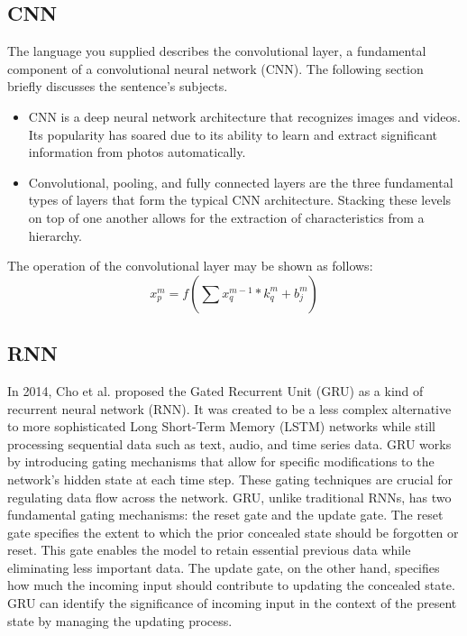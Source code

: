 \documentclass[a4paper,fleqn]{cas-sc}
\begin{document}
  \subsection{CNN}
  The language you supplied describes the convolutional layer, a fundamental component of a convolutional neural
  network (CNN). The following section briefly discusses the sentence’s subjects.\\
  \begin{itemize}
    \item CNN is a deep neural network architecture that recognizes images and videos. Its popularity has soared due to
    its ability to learn and extract significant information from photos automatically.
    \item Convolutional, pooling, and fully connected layers are the three fundamental types of layers that form the typical CNN architecture. Stacking these levels on top of one another allows for the extraction of characteristics from a hierarchy.\cite{subham}
  \end{itemize}
  The operation of the convolutional layer may be shown as follows:
  \begin{equation}
  x^{m}_p = f(\sum_{}^{}x^{m-1}_q*k^{m}_q+b^{m}_j)
  \end{equation}
  
  \subsection{RNN}
  In 2014, Cho et al. proposed the Gated Recurrent Unit (GRU) as a kind of recurrent neural network (RNN). It was created to be a less complex alternative to more sophisticated Long Short-Term Memory (LSTM) networks while still processing sequential data such as text, audio, and time series data. GRU works by introducing gating mechanisms that allow for specific modifications to the network’s hidden state at each time step. These gating techniques are crucial for regulating data flow across the network. GRU, unlike traditional RNNs, has two fundamental gating mechanisms: the reset gate and the update gate. The reset gate specifies the extent to which the prior concealed state should be forgotten or reset. This gate enables the model to retain essential previous data while eliminating less important data. The update gate, on the other hand, specifies how much the incoming input should contribute to updating the concealed state. GRU can identify the significance of incoming input in the context of the present state by managing the updating process.\cite{subham}
\end{document}
